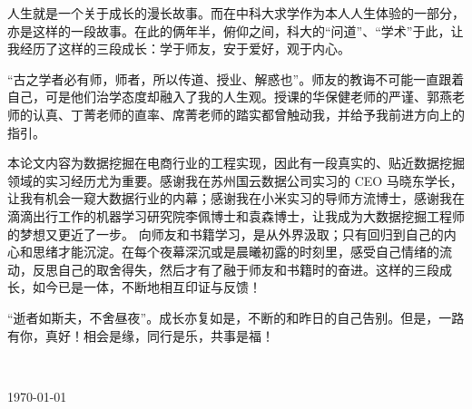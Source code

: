 
\begin{thanks}

人生就是一个关于成长的漫长故事。而在中科大求学作为本人人生体验的一部分，亦是这样的一段故事。在此的俩年半，俯仰之间，科大的“问道”、“学术”于此，让我经历了这样的三段成长：学于师友，安于爱好，观于内心。

“古之学者必有师，师者，所以传道、授业、解惑也”。师友的教诲不可能一直跟着自己，可是他们治学态度却融入了我的人生观。授课的华保健老师的严谨、郭燕老师的认真、丁菁老师的直率、席菁老师的踏实都曾触动我，并给予我前进方向上的指引。

本论文内容为数据挖掘在电商行业的工程实现，因此有一段真实的、贴近数据挖掘领域的实习经历尤为重要。感谢我在苏州国云数据公司实习的 CEO 马晓东学长，让我有机会一窥大数据行业的内幕；感谢我在小米实习的导师方流博士，感谢我在滴滴出行工作的机器学习研究院李佩博士和袁森博士，让我成为大数据挖掘工程师的梦想又更近了一步。
向师友和书籍学习，是从外界汲取；只有回归到自己的内心和思绪才能沉淀。在每个夜幕深沉或是晨曦初露的时刻里，感受自己情绪的流动，反思自己的取舍得失，然后才有了融于师友和书籍时的奋进。这样的三段成长，如今已是一体，不断地相互印证与反馈！

“逝者如斯夫，不舍昼夜”。成长亦复如是，不断的和昨日的自己告别。但是，一路有你，真好！相会是缘，同行是乐，共事是福！

\vskip 18pt

\begin{flushright}

~~~~\ustc@author~~~~

\today

\end{flushright}

\end{thanks}
